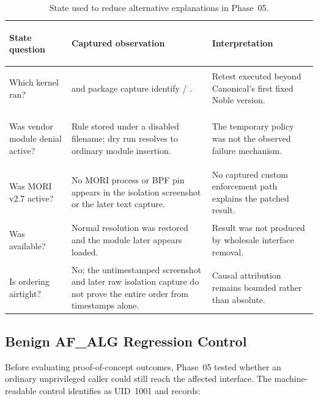 \begin{table}[H]
    \centering
    \caption{State used to reduce alternative explanations in Phase~05.}
    \label{tab:phase05-isolation-state}
    \small
    \begin{tabularx}{\textwidth}{@{}>{\bfseries\raggedright\arraybackslash}p{}>{\raggedright\arraybackslash}p{}Y@{}}
        \toprule
        State question & Captured observation & Interpretation \\
        \midrule
        Which kernel ran? &
         and package capture identify
         / . &
        Retest executed beyond Canonical's first fixed Noble version. \\

        Was vendor module denial active? &
        Rule stored under a disabled filename; dry run resolves to ordinary
        module insertion. &
        The temporary  policy was not the observed failure
        mechanism. \\

        Was MORI v2.7 active? &
        No MORI process or BPF pin appears in the isolation screenshot or the
        later text capture. &
        No captured custom enforcement path explains the patched result. \\

        Was  available? &
        Normal resolution was restored and the module later appears loaded. &
        Result was not produced by wholesale interface removal. \\

        Is ordering airtight? &
        No; the untimestamped screenshot and later raw isolation capture do not
        prove the entire order from timestamps alone. &
        Causal attribution remains bounded rather than absolute. \\
        \bottomrule
    \end{tabularx}
\end{table}

\subsection{Benign AF\_ALG Regression Control}

Before evaluating proof-of-concept outcomes, Phase~05 tested whether an
ordinary unprivileged caller could still reach the affected interface. The
machine-readable control identifies  as UID~1001 and records:

